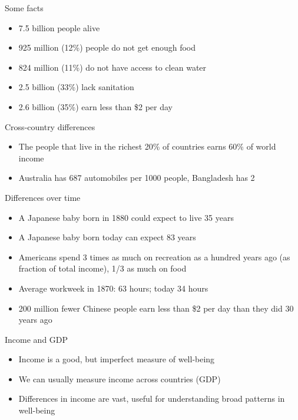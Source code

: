 \documentclass[10pt]{beamer}
\begin{document}
\begin{frame}[label={sec:org5ab500e}]{}
\alert{Some facts}
\begin{itemize}
\item 7.5 billion people alive
\item 925 million (12\%) people do not get enough food
\item 824 million (11\%) do not have access to clean water
\item 2.5 billion (33\%) lack sanitation
\item 2.6 billion (35\%) earn less than \$2 per day
\end{itemize}
\end{frame}

\begin{frame}[label={sec:orga757789}]{}
\alert{Cross-country differences}
\begin{itemize}
\item The people that live in the richest 20\% of countries earns 60\% of world income
\item Australia has 687 automobiles per 1000 people, Bangladesh has 2
\end{itemize}
\end{frame}

\begin{frame}[label={sec:orgc8c300f}]{}
\alert{Differences over time}
\begin{itemize}
\item A Japanese baby born in 1880 could expect to live 35 years
\item A Japanese baby born today can expect 83 years
\item Americans spend 3 times as much on recreation as a hundred years ago (as fraction of total income), 1/3 as much on food
\item Average workweek in 1870: 63 hours; today 34 hours
\item 200 million fewer Chinese people earn less than \$2 per day than they did 30 years ago
\end{itemize}
\end{frame}

\begin{frame}[label={sec:org06200c4}]{}
\alert{Income and GDP}
\begin{itemize}
\item Income is a good, but imperfect measure of well-being
\item We can usually measure income across countries (GDP)
\item Differences in income are vast, useful for understanding broad patterns in well-being
\end{itemize}
\end{frame}
\end{document}
